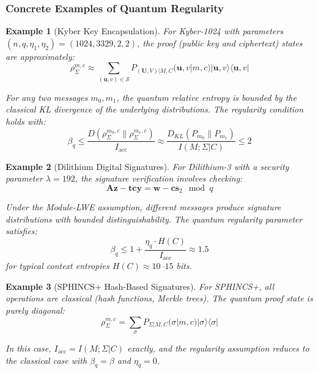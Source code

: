 \documentclass{ieeeaccess}
\newtheorem{example}{Example}[section]
\begin{document}
\subsubsection{Concrete Examples of Quantum Regularity}

\begin{example}[Kyber Key Encapsulation]
For Kyber-1024 with parameters $(n, q, \eta_1, \eta_2) = (1024, 3329, 2, 2)$, the proof (public key and ciphertext) states are approximately:
\begin{equation}
    \rho_\Sigma^{m,c} \approx \sum_{(\mathbf{u}, v) \in \mathcal{S}} P_{(\mathbf{U},V)|M,C}(\mathbf{u}, v|m, c) |\mathbf{u}, v\rangle\langle\mathbf{u}, v|
\end{equation}

For any two messages $m_0, m_1$, the quantum relative entropy is bounded by the classical KL divergence of the underlying distributions. The regularity condition holds with:
\begin{equation}
    \beta_q \leq \frac{D(\rho_\Sigma^{m_0,c}\|\rho_\Sigma^{m_1,c})}{I_{\mathrm{acc}}} \approx \frac{D_{KL}(P_{m_0}\|P_{m_1})}{I(M;\Sigma|C)} \leq 2
\end{equation}
\end{example}

\begin{example}[Dilithium Digital Signatures]
For Dilithium-3 with a security parameter $\lambda = 192$, the signature verification involves checking:
\begin{equation}
    \mathbf{Az} - \mathbf{tc}\mathbf{y} = \mathbf{w} - \mathbf{c}\mathbf{s}_2 \mod q
\end{equation}

Under the Module-LWE assumption, different messages produce signature distributions with bounded distinguishability. The quantum regularity parameter satisfies:
\begin{equation}
    \beta_q \leq 1 + \frac{\eta_q \cdot H(C)}{I_{\mathrm{acc}}} \approx 1.5
\end{equation}
for typical context entropies $H(C) \approx 10$--$15$ bits.
\end{example}

\begin{example}[SPHINCS+ Hash-Based Signatures]
For SPHINCS+, all operations are classical (hash functions, Merkle trees). The quantum proof state is purely diagonal:
\begin{equation}
    \rho_\Sigma^{m,c} = \sum_{\sigma} P_{\Sigma|M,C}(\sigma|m, c) |\sigma\rangle\langle\sigma|
\end{equation}

In this case, $I_{\mathrm{acc}} = I(M;\Sigma|C)$ exactly, and the regularity assumption reduces to the classical case with $\beta_q = \beta$ and $\eta_q = 0$.
\end{example}
\end{document}

